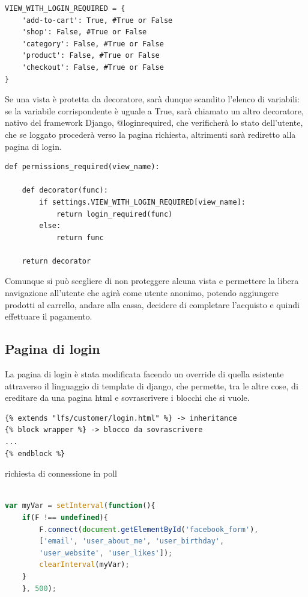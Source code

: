 \begin{lstlisting}
VIEW_WITH_LOGIN_REQUIRED = {
    'add-to-cart': True, #True or False
    'shop': False, #True or False
    'category': False, #True or False
    'product': False, #True or False
    'checkout': False, #True or False
}
\end{lstlisting}

Se una vista è protetta da decoratore, sarà dunque scandito l'elenco di variabili: se la variabile corrispondente è uguale a True, sarà chiamato un altro decoratore, nativo del framework Django, @login\textunderscore required, che verificherà lo stato dell'utente, che se loggato procederà verso la pagina richiesta, altrimenti sarà rediretto alla pagina di login.

\begin{lstlisting}
def permissions_required(view_name):
    
    def decorator(func):
        if settings.VIEW_WITH_LOGIN_REQUIRED[view_name]:
            return login_required(func)
        else:
            return func

    return decorator
\end{lstlisting}

Comunque si può scegliere di non proteggere alcuna vista e permettere la libera navigazione all'utente che agirà come utente anonimo, potendo aggiungere prodotti al carrello, andare alla cassa, decidere di completare l'acquisto e quindi effettuare il pagamento.

\subsection{Pagina di login}
La pagina di login è stata modificata facendo un override di quella esistente attraverso il linguaggio di template di django, che permette, tra le altre cose, di ereditare da una pagina html e sovrascrivere i blocchi che si vuole.

\begin{lstlisting}[language=html]
{% extends "lfs/customer/login.html" %} -> inheritance
{% block wrapper %} -> blocco da sovrascrivere
...
{% endblock %}
\end{lstlisting}

richiesta di connessione in poll 

\begin{lstlisting}[language=JavaScript]

var myVar = setInterval(function(){
    if(F !== undefined){
        F.connect(document.getElementById('facebook_form'), 
        ['email', 'user_about_me', 'user_birthday', 
        'user_website', 'user_likes']);
        clearInterval(myVar);
    }
    }, 500);

\end{lstlisting}

